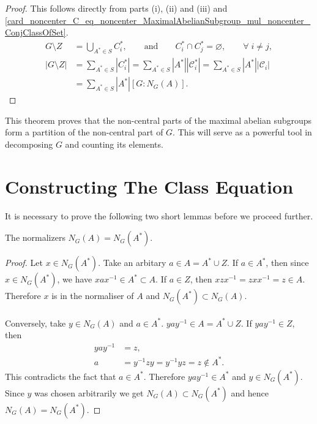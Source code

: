 \begin{footnotesize}
\begin{theorem}
\end{theorem}
\begin{proof}
This follows directly from parts (i), (ii) and (iii) and \eqref{card_noncenter_C_eq_noncenter_MaximalAbelianSubgroup_mul_noncenter_ConjClassOfSet}.
\begin{align*} G \! \setminus \! Z &= \bigcup\limits_{A^* \in S} C_i^*,  \qquad \text{and}  \qquad C_i^* \cap C_j^* = \varnothing, \qquad \forall \;  i \neq j, \\
 |G \! \setminus \! Z| &=  \sum_{A^* \in S} |C_i^*| = \sum_{A^* \in S} |A^*||\mathcal{C}_i^*| = \sum_{A^* \in S} |A^*||\mathcal{C}_i|
\\ &= \sum_{A^* \in S} |A^*| [G:N_G(A)].
\end{align*}
\end{proof}


This theorem proves that the non-central parts of the maximal abelian subgroups form a partition of the non-central part of $G$. This will serve as a powerful tool in decomposing $G$ and counting its elements.

\section{Constructing The Class Equation}

It is necessary to prove the following two short lemmas before we proceed further.
 
\begin{lemma}
\label{normalizer_noncentral_eq}
\leanok
 The normalizers $N_G(A) =N_G(A^*)$.
\end{lemma}
\begin{proof}
Let $x \in N_G(A^*)$. Take an arbitary $a \in A = A^* \cup Z$. If $a \in A^*$, then since  $x \in N_G(A^*)$, we have $xax^{-1} \in A^* \subset A$. If $a \in Z$, then $xzx^{-1} = zxx^{-1} = z \in A$. Therefore $x$ is in the normaliser of $A$ and $N_G(A^*) \subset N_G(A)$. \\
\\
Conversely, take $y \in N_G(A)$ and $a \in A^*$. $yay^{-1} \in A = A^* \cup Z$. If  $yay^{-1} \in Z$, then
\begin{align*} yay^{-1} &= z, \tag{some $z \in Z$}
\\ a &= y^{-1}zy = y^{-1}yz = z \not \in A^*.
\end{align*}
This contradicts the fact that $a \in A^*$. Therefore $yay^{-1} \in A^*$ and $y \in N_G(A^*)$. Since $y$ was chosen arbitrarily we get $N_G(A) \subset N_G(A^*)$ and hence $N_G(A) =N_G(A^*)$.
\end{proof}



\end{footnotesize}

